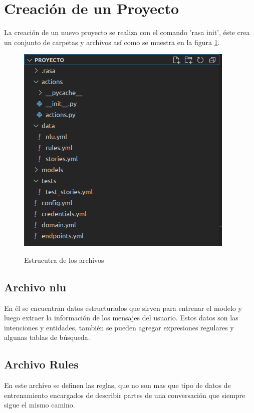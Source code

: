 \section{Creación de un Proyecto}
\indent La creación de un nuevo proyecto se realiza con el comando 'rasa init', éste crea un
conjunto de carpetas y archivos así como se muestra en la figura \ref{fig:Estructura}.
\begin{figure}[h]
	\centering
	\includegraphics[width=\textwidth]{imagenes/cap3/4_Estructura del Proyecto.png}
	\caption{Estrucutra de los archivos}
	\label{fig:Estructura}
	\cite{Rasa}
\end{figure}
\subsection{Archivo nlu}
En él se encuentran datos estructurados que sirven para entrenar el modelo y luego extraer la
información de los mensajes del usuario. Estos datos son  las intenciones y entidades, también se
pueden agregar expresiones regulares y algunas tablas de búsqueda. \cite{NLU_Documentation}

\subsection{Archivo Rules}
En este archivo se definen las reglas, que no son mas que  tipo de datos de entrenamiento
encargados de describir partes de una conversación que siempre sigue el mismo
camino.\cite{Rules_Documentation}

